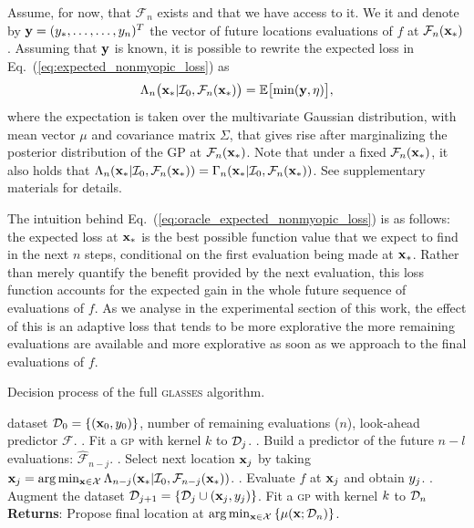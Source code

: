 \documentclass[twoside]{article}
\newcommand{\I}{\mathcal{I}}
\newcommand{\E}{\mathbb{E}}
\newcommand{\future}{\mathcal{F}}
\newcommand{\acr}[1]{\textsc{#1}\xspace}
\newcommand{\gp}{\acr{gp}}
\newcommand{\us}{\acr{glasses}}
\begin{document}
Assume, for now, that $\future_{n}$ exists and that we have access to it. We it and denote by $\mathbf{y}=(y_*,\dots,\dots,y_n)^T$ the vector of future locations evaluations of $f$ at $\future_n(\latentVector_*)$. Assuming that $\mathbf{y}$ is known, it is possible to rewrite the expected loss in Eq.~(\ref{eq:expected_nonmyopic_loss}) as
\begin{equation}\label{eq:oracle_expected_nonmyopic_loss}
\Lambda_n \bigl(\latentVector_*|\I_0, \future_{n}(\latentVector_*) \bigr) = \E \bigl[\min (\dataVector,\eta) \bigr], 
\end{equation}
where the expectation is taken over the multivariate Gaussian distribution, with mean vector $\mu$ and covariance matrix $\Sigma$, that gives rise after marginalizing the posterior distribution of the GP at $\future_{n}(\latentVector_*)$. Note that under a fixed $\future_{n}(\latentVector_*)$, it also holds that $\Lambda_n(\latentVector_*|\I_0, \future_{n}(\latentVector_*)) = \Gamma_n(\latentVector_*|\I_0,\future_{n}(\latentVector_*))$. See supplementary materials for details.

The intuition behind Eq.~(\ref{eq:oracle_expected_nonmyopic_loss}) is as follows: the expected loss at $\mathbf{x}_*$ is the best possible function value that we expect to find in the next $n$ steps, conditional on the first evaluation being made at $\mathbf{x}_*$. Rather than merely quantify the benefit provided by the next evaluation, this loss function accounts for the expected gain in the whole future sequence of evaluations of $f$. As we analyse in the experimental section of this work, the effect of this is an adaptive loss that tends to be more explorative the more remaining evaluations are available and more explorative as soon as we approach to the final evaluations of $f$.

\begin{algorithm*}[t!]
   \caption{Decision process of the full \us algorithm.}
   \label{alg:glasses}
\begin{algorithmic}
    dataset $\mathcal{D}_{0} = \{(\textbf{x}_0, y_0)\}$, number of remaining evaluations ($n$), look-ahead predictor $\future$.
   . Fit a \gp with kernel $k$ to $\mathcal{D}_{j}$.
   . Build a predictor of the future $n-l$ evaluations: $\hat{\future}_{n-j}$.
   . Select next location $\mathbf{x}_j$ by taking  $\latentVector_j = \arg \min_{\latentVector \in {\mathcal X}}\Lambda_{n-j}(\latentVector_*|\I_0, \future_{n-j}(\latentVector_*))$.
   . Evaluate $f$ at $\mathbf{x}_j$ and obtain $y_j$.
   . Augment the dataset $\mathcal{D}_{j+1} = \{\mathcal{D}_{j} \cup (\textbf{x}_j, y_j)\}$.
   \ENDFOR
   \STATE Fit a \gp with kernel $k$ to $\mathcal{D}_{n}$
   \STATE \textbf{Returns}: Propose final location at $\arg \min_{\mathbf{x} \in \mathcal{X}} \left\{\mu(\mathbf{x}; \mathcal{D}_{n})\right\}$.  
\end{algorithmic}
\end{algorithm*}
\end{document}
